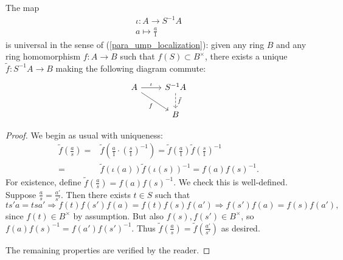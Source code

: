 \documentclass[12pt]{article}
\begin{document}
\begin{proposition}
	The map 
	\begin{gather*}
		\iota: A \to S^{-1}A \\
		a\mapsto \frac{a}{1}
	\end{gather*}
	is universal in the sense of (\ref{para_ump_localization}): given any ring $B$ and any ring homomorphism $f:A\to B$ such that $f(S)\subset B^\times$, there exists a unique $\tilde{f}:S^{-1}A\to B$ making the following diagram commute:
	\begin{equation*}
\begin{tikzcd}
	A \arrow[r, "\iota"] \arrow[rd, "f"'] & S^{-1}A \arrow[d, "\tilde{f}", dashed] \\
                                      & B                                            
\end{tikzcd}
	\end{equation*}

\end{proposition}
\begin{proof}
	We begin as usual with uniqueness:
	\begin{align*}
		\tilde{f}(\frac{a}{s}) 
		=& \tilde{f}(\frac{a}{1}\cdot (\frac{s}{1})^{-1}) = \tilde{f}(\frac{a}{1})\tilde{f}(\frac{s}{1})^{-1} \\
		=& \tilde{f}(\iota(a))\tilde{f}(\iota(s))^{-1} = f(a)f(s)^{-1}.
	\end{align*}
	For existence, define $\tilde{f}(\frac{a}{s})=f(a)f(s)^{-1}$. We check this is well-defined. Suppose $\frac{a}{s}=\frac{a'}{s'}$. Then there exists $t\in S$ such that 
	\begin{equation*}
		ts'a=tsa' \Rightarrow f(t)f(s')f(a)=f(t)f(s)f(a') \Rightarrow f(s')f(a)=f(s)f(a'),
	\end{equation*}
	since $f(t)\in B^\times$ by assumption. But also $f(s),f(s')\in B^\times$, so $f(a)f(s)^{-1}=f(a')f(s')^{-1}$. Thus $\tilde{f}(\frac{a}{s})=\tilde{f}(\frac{a'}{s'})$ as desired.

	The remaining properties are verified by the reader.
\end{proof}
\end{document}
